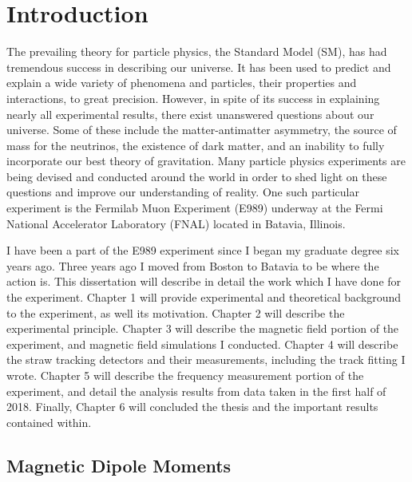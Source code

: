 
\thispagestyle{myheadings}
\graphicspath{{Body/Figures/Theory/}}

\chapter{Introduction}
\label{chapter:Introduction}

The prevailing theory for particle physics, the Standard Model (SM), has had tremendous success in describing our universe. It has been used to predict and explain a wide variety of phenomena and particles, their properties and interactions, to great precision. However, in spite of its success in explaining nearly all experimental results, there exist unanswered questions about our universe. Some of these include the matter-antimatter asymmetry, the source of mass for the neutrinos, the existence of dark matter, and an inability to fully incorporate our best theory of gravitation. Many particle physics experiments are being devised and conducted around the world in order to shed light on these questions and improve our understanding of reality. One such particular experiment is the Fermilab Muon \gmtwo Experiment (E989) underway at the Fermi National Accelerator Laboratory (FNAL) located in Batavia, Illinois.

I have been a part of the E989 experiment since I began my graduate degree six years ago. Three years ago I moved from Boston to Batavia to be where the action is. This dissertation will describe in detail the work which I have done for the experiment. Chapter 1 will provide experimental and theoretical background to the experiment, as well its motivation. Chapter 2 will  describe the experimental principle. Chapter 3 will describe the magnetic field portion of the experiment, and magnetic field simulations I conducted. Chapter 4 will describe the straw tracking detectors and their measurements, including the track fitting I wrote. Chapter 5 will describe the frequency measurement portion of the experiment, and detail the analysis results from data taken in the first half of 2018. Finally, Chapter 6 will concluded the thesis and the important results contained within.


\section{Magnetic Dipole Moments}
\label{sec:MDMs}

